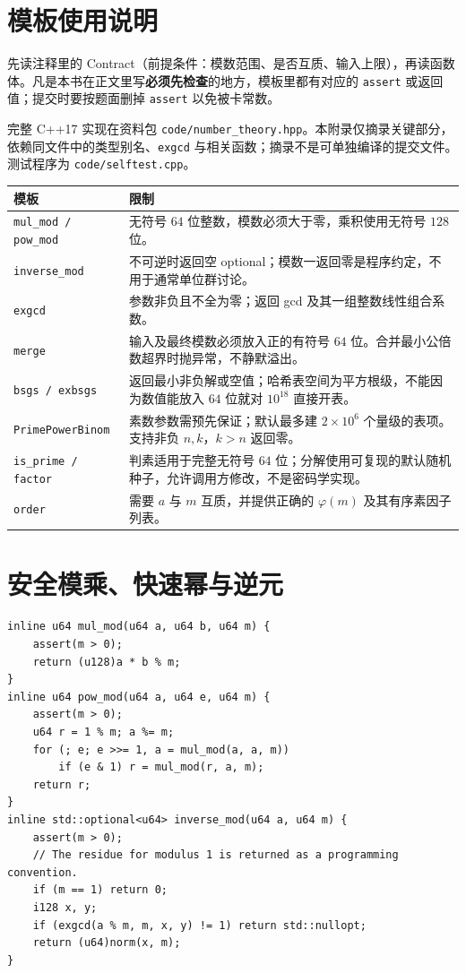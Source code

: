 \section{模板使用说明}

\begin{tip}[附录代码怎么读]
先读注释里的 Contract（前提条件：模数范围、是否互质、输入上限），再读函数体。凡是本书在正文里写\textbf{必须先检查}的地方，模板里都有对应的 \texttt{assert} 或返回值；提交时要按题面删掉 \texttt{assert} 以免被卡常数。
\end{tip}

完整 C++17 实现在资料包 \texttt{code/number\_theory.hpp}。本附录仅摘录关键部分，依赖同文件中的类型别名、\texttt{exgcd} 与相关函数；摘录不是可单独编译的提交文件。测试程序为 \texttt{code/selftest.cpp}。

\begin{longtable}{p{}p{}}
\toprule
模板 & 限制\\\midrule
\texttt{mul\_mod / pow\_mod} & 无符号 $64$ 位整数，模数必须大于零，乘积使用无符号 $128$ 位。\\
\texttt{inverse\_mod} & 不可逆时返回空 optional；模数一返回零是程序约定，不用于通常单位群讨论。\\
\texttt{exgcd} & 参数非负且不全为零；返回 gcd 及其一组整数线性组合系数。\\
\texttt{merge} & 输入及最终模数必须放入正的有符号 $64$ 位。合并最小公倍数超界时抛异常，不静默溢出。\\
\texttt{bsgs / exbsgs} & 返回最小非负解或空值；哈希表空间为平方根级，不能因为数值能放入 $64$ 位就对 $10^{18}$ 直接开表。\\
\texttt{PrimePowerBinom} & 素数参数需预先保证；默认最多建 $2\times10^6$ 个量级的表项。支持非负 $n,k$，$k>n$ 返回零。\\
\texttt{is\_prime / factor} & 判素适用于完整无符号 $64$ 位；分解使用可复现的默认随机种子，允许调用方修改，不是密码学实现。\\
\texttt{order} & 需要 $a$ 与 $m$ 互质，并提供正确的 $\varphi(m)$ 及其有序素因子列表。\\
\bottomrule
\end{longtable}

\section{安全模乘、快速幂与逆元}
\begin{lstlisting}
inline u64 mul_mod(u64 a, u64 b, u64 m) {
    assert(m > 0);
    return (u128)a * b % m;
}
inline u64 pow_mod(u64 a, u64 e, u64 m) {
    assert(m > 0);
    u64 r = 1 % m; a %= m;
    for (; e; e >>= 1, a = mul_mod(a, a, m))
        if (e & 1) r = mul_mod(r, a, m);
    return r;
}
inline std::optional<u64> inverse_mod(u64 a, u64 m) {
    assert(m > 0);
    // The residue for modulus 1 is returned as a programming convention.
    if (m == 1) return 0;
    i128 x, y;
    if (exgcd(a % m, m, x, y) != 1) return std::nullopt;
    return (u64)norm(x, m);
}
\end{lstlisting}

